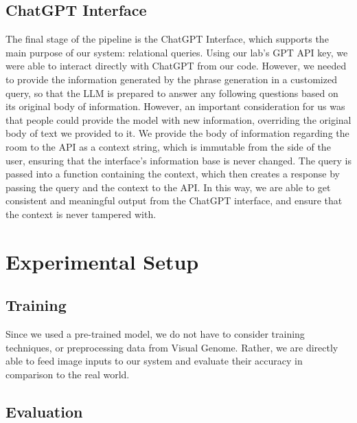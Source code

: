 \documentclass[letterpaper, 10 pt, conference]{ieeeconf}  %
\begin{document}
    \subsection*{ChatGPT Interface}
        The final stage of the pipeline is the ChatGPT Interface, which supports the main purpose of our system: relational queries. Using our lab's GPT API key, we were able to interact directly with ChatGPT from our code. However, we needed to provide the information generated by the phrase generation in a customized query, so that the LLM is prepared to answer any following questions based on its original body of information. However, an important consideration for us was that people could provide the model with new information, overriding the original body of text we provided to it. We provide the body of information regarding the room to the API as a context string, which is immutable from the side of the user, ensuring that the interface's information base is never changed. The query is passed into a function containing the context, which then creates a response by passing the query and the context to the API. In this way, we are able to get consistent and meaningful output from the ChatGPT interface, and ensure that the context is never tampered with.


\section{Experimental Setup}
\subsection*{Training}
    Since we used a pre-trained model, we do not have to consider training techniques, or preprocessing data from Visual Genome. Rather, we are directly able to feed image inputs to our system and evaluate their accuracy in comparison to the real world.

\subsection*{Evaluation}
\end{document}
